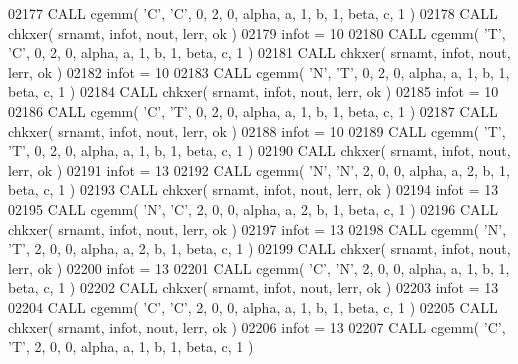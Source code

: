 \begin{DoxyCode}
02177       \textcolor{keyword}{CALL }cgemm( \textcolor{stringliteral}{'C'}, \textcolor{stringliteral}{'C'}, 0, 2, 0, alpha, a, 1, b, 1, beta, c, 1 )
02178       \textcolor{keyword}{CALL }chkxer( srnamt, infot, nout, lerr, ok )
02179       infot = 10
02180       \textcolor{keyword}{CALL }cgemm( \textcolor{stringliteral}{'T'}, \textcolor{stringliteral}{'C'}, 0, 2, 0, alpha, a, 1, b, 1, beta, c, 1 )
02181       \textcolor{keyword}{CALL }chkxer( srnamt, infot, nout, lerr, ok )
02182       infot = 10
02183       \textcolor{keyword}{CALL }cgemm( \textcolor{stringliteral}{'N'}, \textcolor{stringliteral}{'T'}, 0, 2, 0, alpha, a, 1, b, 1, beta, c, 1 )
02184       \textcolor{keyword}{CALL }chkxer( srnamt, infot, nout, lerr, ok )
02185       infot = 10
02186       \textcolor{keyword}{CALL }cgemm( \textcolor{stringliteral}{'C'}, \textcolor{stringliteral}{'T'}, 0, 2, 0, alpha, a, 1, b, 1, beta, c, 1 )
02187       \textcolor{keyword}{CALL }chkxer( srnamt, infot, nout, lerr, ok )
02188       infot = 10
02189       \textcolor{keyword}{CALL }cgemm( \textcolor{stringliteral}{'T'}, \textcolor{stringliteral}{'T'}, 0, 2, 0, alpha, a, 1, b, 1, beta, c, 1 )
02190       \textcolor{keyword}{CALL }chkxer( srnamt, infot, nout, lerr, ok )
02191       infot = 13
02192       \textcolor{keyword}{CALL }cgemm( \textcolor{stringliteral}{'N'}, \textcolor{stringliteral}{'N'}, 2, 0, 0, alpha, a, 2, b, 1, beta, c, 1 )
02193       \textcolor{keyword}{CALL }chkxer( srnamt, infot, nout, lerr, ok )
02194       infot = 13
02195       \textcolor{keyword}{CALL }cgemm( \textcolor{stringliteral}{'N'}, \textcolor{stringliteral}{'C'}, 2, 0, 0, alpha, a, 2, b, 1, beta, c, 1 )
02196       \textcolor{keyword}{CALL }chkxer( srnamt, infot, nout, lerr, ok )
02197       infot = 13
02198       \textcolor{keyword}{CALL }cgemm( \textcolor{stringliteral}{'N'}, \textcolor{stringliteral}{'T'}, 2, 0, 0, alpha, a, 2, b, 1, beta, c, 1 )
02199       \textcolor{keyword}{CALL }chkxer( srnamt, infot, nout, lerr, ok )
02200       infot = 13
02201       \textcolor{keyword}{CALL }cgemm( \textcolor{stringliteral}{'C'}, \textcolor{stringliteral}{'N'}, 2, 0, 0, alpha, a, 1, b, 1, beta, c, 1 )
02202       \textcolor{keyword}{CALL }chkxer( srnamt, infot, nout, lerr, ok )
02203       infot = 13
02204       \textcolor{keyword}{CALL }cgemm( \textcolor{stringliteral}{'C'}, \textcolor{stringliteral}{'C'}, 2, 0, 0, alpha, a, 1, b, 1, beta, c, 1 )
02205       \textcolor{keyword}{CALL }chkxer( srnamt, infot, nout, lerr, ok )
02206       infot = 13
02207       \textcolor{keyword}{CALL }cgemm( \textcolor{stringliteral}{'C'}, \textcolor{stringliteral}{'T'}, 2, 0, 0, alpha, a, 1, b, 1, beta, c, 1 )

\end{DoxyCode}
